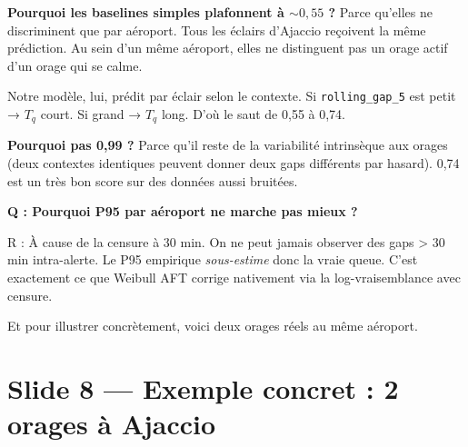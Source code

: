 \documentclass[11pt,a4paper]{article}
\begin{document}
\begin{compr}
\textbf{Pourquoi les baselines simples plafonnent à $\sim 0{,}55$ ?} Parce qu'elles ne
discriminent que par aéroport. Tous les éclairs d'Ajaccio reçoivent la même prédiction. Au
sein d'un même aéroport, elles ne distinguent pas un orage actif d'un orage qui se calme.

Notre modèle, lui, prédit par éclair selon le contexte. Si \texttt{rolling\_gap\_5} est
petit → $T_q$ court. Si grand → $T_q$ long. D'où le saut de 0,55 à 0,74.

\textbf{Pourquoi pas 0,99 ?} Parce qu'il reste de la variabilité intrinsèque aux orages
(deux contextes identiques peuvent donner deux gaps différents par hasard). 0,74 est un
très bon score sur des données aussi bruitées.
\end{compr}

\begin{piege}
\textbf{Q : Pourquoi P95 par aéroport ne marche pas mieux ?}

R : À cause de la censure à 30 min. On ne peut jamais observer des gaps > 30 min
intra-alerte. Le P95 empirique \emph{sous-estime} donc la vraie queue. C'est exactement ce
que Weibull AFT corrige nativement via la log-vraisemblance avec censure.
\end{piege}

\begin{transit}
\og Et pour illustrer concrètement, voici deux orages réels au même aéroport. \fg{}
\end{transit}

\section{Slide 8 — Exemple concret : 2 orages à Ajaccio}
\end{document}
